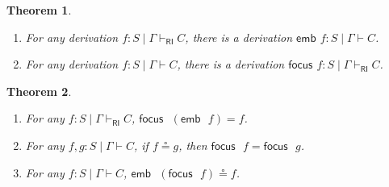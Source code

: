 \documentclass[submission,copyright,creativecommons]{eptcs}
\newtheorem{theorem}{Theorem}
\newcommand{\RI}{\mathsf{RI}}
\begin{document}
\begin{theorem}
  \begin{enumerate}
    \item For any derivation $f : S \mid \Gamma \vdash_{\mathsf{RI}} C$, there is a derivation $\mathsf{emb}$ $f : S \mid \Gamma \vdash C$.
    \item For any derivation $f : S \mid \Gamma \vdash C$, there is a derivation $\mathsf{focus}$ $f : S \mid \Gamma \vdash_{\mathsf{RI}} C$.
  \end{enumerate}
\end{theorem}
\begin{theorem}
  \begin{enumerate}
    \item For any $f : S \mid \Gamma \vdash_{\RI} C$, $\mathsf{focus} \text{ } (\mathsf{emb} \text{ } f) = f$.
    \item For any $f, g : S \mid \Gamma \vdash C$,  if $f \circeq g$, then $\mathsf{focus} \text{ } f = \mathsf{focus} \text{ } g$.
    \item For any $f : S \mid \Gamma \vdash C$, $\mathsf{emb} \text{ } (\mathsf{focus} \text{ } f) \circeq f$.
  \end{enumerate}
\end{theorem}
\end{document}

